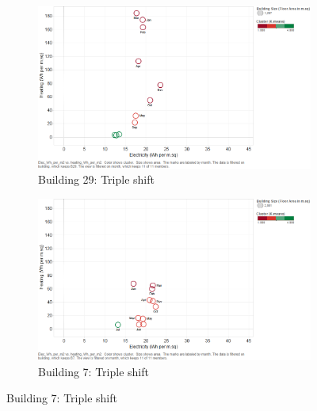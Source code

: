 \begin{figure}[H]
        \centering
        \begin{subfigure}[b]{0.45\textwidth}
                \includegraphics[width=\textwidth]{images/b29_kmeans_allmonths.png}
                \caption{Building 29:  Triple shift}
                \label{fig:tri_1}
        \end{subfigure}%
        \begin{subfigure}[b]{0.45\textwidth}
                \includegraphics[width=\textwidth]{images/b7_kmeans_allmonths.png}
                \caption{Building 7: Triple shift}
                \label{fig:tri_2}
        \end{subfigure}
        

\end{figure}
